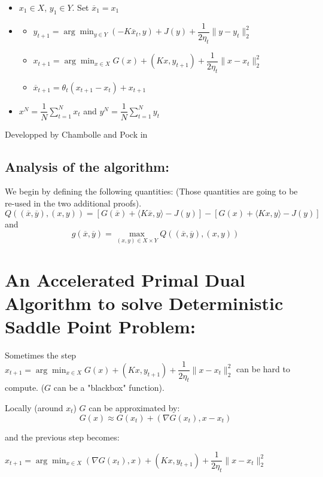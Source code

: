 \documentclass[12pt,reqno]{amsart}
\numberwithin{equation}{section}
\begin{document}
\begin{itemize}
\item $x_{1} \in X$, $y_{1} \in Y$. Set $\overline{x}_{1} = x_{1}$
\item

\begin{itemize}
\item $y_{t+1} = \arg\min_{y \in Y} (-K\overline{x}_{t},y) + J(y) + \dfrac{1}{2\eta_{t}} \lVert y - y_{t} \rVert_{2}^{2}$
\item $x_{t+1} = \arg\min_{x \in X} G(x) + (Kx,y_{t+1}) + \dfrac{1}{2\eta_{t}}\lVert x - x_{t} \rVert_{2}^{2} $
\item $\overline{x}_{t+1} = \theta_{t}(x_{t+1} - x_{t}) + x_{t+1}$
\end{itemize}

\item $x^{N} = \dfrac{1}{N}\sum_{t=1}^{N} x_{t}$ and $y^{N} = \dfrac{1}{N}\sum_{t=1}^{N} y_{t}$
\end{itemize}

Developped by Chambolle and Pock in \cite{ChambollePock}

\subsection{ Analysis of the algorithm: }

We begin by defining the following quantities:
(Those quantities are going to be re-used in the two additional proofs).
$$
Q((\overline{x},\overline{y}),(x,y)) = [G(\overline{x}) + \langle K\overline{x},y\rangle - J(y)] - [G(x) + \langle Kx,y\rangle - J(y)]
$$
and
$$
g(\overline{x},\overline{y}) = \max_{(x,y)\in X \times Y} Q((\overline{x},\overline{y}),(x,y))
$$



\section{ An Accelerated Primal Dual Algorithm to solve Deterministic Saddle Point Problem: }


Sometimes the step $x_{t+1} = \arg\min_{x \in X} G(x) + (Kx,y_{t+1}) + \dfrac{1}{2\eta_{t}}\lVert x - x_{t} \rVert_{2}^{2}$ can be hard to compute.
($G$ can be a "blackbox" function).

Locally (around $x_{t}$) $G$ can be approximated by:
$$
G(x) \approx G(x_{t}) + (\nabla G(x_{t}),x - x_{t})
$$

and the previous step becomes:

$x_{t+1} = \arg\min_{x \in X} (\nabla G(x_{t}),x) + (Kx,y_{t+1}) + \dfrac{1}{2\eta_{t}}\lVert x - x_{t} \rVert_{2}^{2}$
\end{document}
